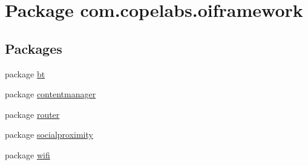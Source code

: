 \hypertarget{namespacecom_1_1copelabs_1_1oiframework}{}\section{Package com.\+copelabs.\+oiframework}
\label{namespacecom_1_1copelabs_1_1oiframework}
\subsection*{Packages}
\begin{DoxyCompactItemize}
\item 
package \hyperlink{namespacecom_1_1copelabs_1_1oiframework_1_1bt}{bt}
\item 
package \hyperlink{namespacecom_1_1copelabs_1_1oiframework_1_1contentmanager}{contentmanager}
\item 
package \hyperlink{namespacecom_1_1copelabs_1_1oiframework_1_1router}{router}
\item 
package \hyperlink{namespacecom_1_1copelabs_1_1oiframework_1_1socialproximity}{socialproximity}
\item 
package \hyperlink{namespacecom_1_1copelabs_1_1oiframework_1_1wifi}{wifi}
\end{DoxyCompactItemize}
